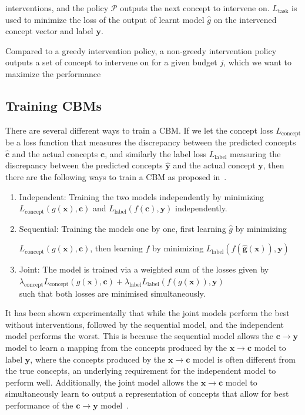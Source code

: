 \documentclass[../main.tex]{subfiles}
\begin{document}
interventions, and the policy $\mathcal{P}$ outputs the next concept to 
intervene on. $L_{\text{task}}$ is used to minimize
the loss of the output of learnt model $\hat{g}$ on the intervened
concept vector and label $\mathbf{y}$.

Compared to a greedy intervention policy, a non-greedy intervention 
policy outputs a set of concept to intervene on for a given budget $j$,
which we want to maximize the performance 

\subsection{Training CBMs}

There are several different ways to train a CBM. 
If we let the concept loss $L_{\text{concept}}$ be a loss
 function that measures
the discrepancy between the predicted concepts $\hat{\mathbf{c}}$
and the actual concepts $\mathbf{c}$, and similarly the 
label loss $L_{\text{label}}$ measuring the discrepancy
between the predicted concepts $\hat{\mathbf{y}}$
and the actual concept $\mathbf{y}$, then there are the following ways
to train a CBM as proposed in~\cite{cbm}.

\begin{enumerate}
    \item Independent: Training the two models independently by minimizing
    $L_{\text{concept}}(g(\mathbf{x}), \mathbf{c})$ and $L_{\text{label}}(f(\mathbf{c}), \mathbf{y})$ independently.
    \item Sequential: Training the models one by one, first learning
    $\hat{g}$ by minimizing 
    
    $L_{\text{concept}}(g(\mathbf{x}), \mathbf{c})$,
    then learning $f$ by minimizing $L_{\text{label}}(f(\mathbf{\hat{g}(\mathbf{x})}), \mathbf{y})$
    \item Joint: The model is trained via a weighted sum of the losses given by \\ 
    $\lambda_{\text{concept}} L_{\text{concept}}(g(\mathbf{x}), \mathbf{c}) + \lambda_{\text{label}} L_{\text{label}}(f(g(\mathbf{x})), \mathbf{y})$ \\
    such that both losses are minimised simultaneously.
\end{enumerate}

It has been shown experimentally that while the joint models perform the best
without interventions, followed by the sequential model, and the independent model
performs the worst. This is because the sequential model allows the $\mathbf{c} \to \mathbf{y}$ 
model to learn a mapping from the concepts produced by the $\mathbf{x} \to \mathbf{c}$ model to
label $\mathbf{y}$, where the concepts produced by the $\mathbf{x} \to \mathbf{c}$ model is often different
from the true concepts, an underlying requirement for the independent model to perform well. Additionally,
the joint model allows the $\mathbf{x} \to \mathbf{c}$ model to simultaneously learn to output a representation
of concepts that allow for best performance of the $\mathbf{c} \to \mathbf{y}$ model~\cite{cbm}.
\end{document}
